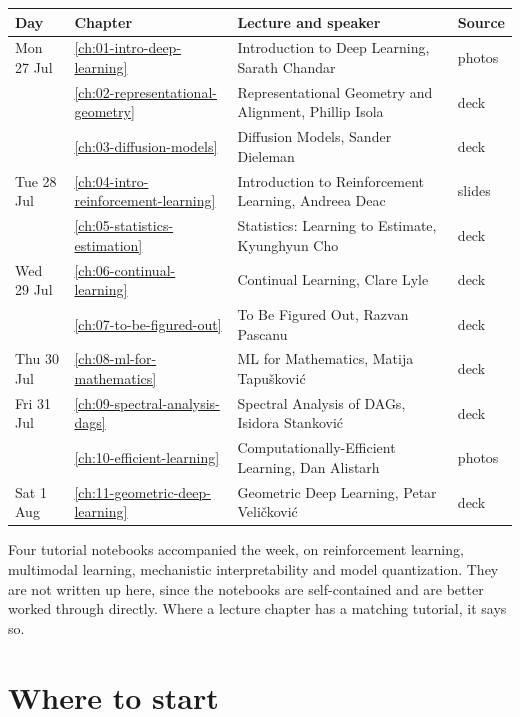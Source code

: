 \begin{center}
\small
\begin{tabularx}{\textwidth}{@{}l l X l@{}}
\toprule
\textbf{Day} & \textbf{Chapter} & \textbf{Lecture and speaker} & \textbf{Source} \\
\midrule
Mon 27 Jul & \ref{ch:01-intro-deep-learning} & Introduction to Deep Learning, Sarath Chandar
  & photos \\
           & \ref{ch:02-representational-geometry} & Representational Geometry and Alignment,
  Phillip Isola & deck \\
           & \ref{ch:03-diffusion-models} & Diffusion Models, Sander Dieleman & deck \\
Tue 28 Jul & \ref{ch:04-intro-reinforcement-learning} & Introduction to Reinforcement Learning,
  Andreea Deac & slides \\
           & \ref{ch:05-statistics-estimation} & Statistics: Learning to Estimate,
  Kyunghyun Cho & deck \\
Wed 29 Jul & \ref{ch:06-continual-learning} & Continual Learning, Clare Lyle & deck \\
           & \ref{ch:07-to-be-figured-out} & To Be Figured Out, Razvan Pascanu & deck \\
Thu 30 Jul & \ref{ch:08-ml-for-mathematics} & ML for Mathematics, Matija Tapu\v{s}kovi\'{c}
  & deck \\
Fri 31 Jul & \ref{ch:09-spectral-analysis-dags} & Spectral Analysis of DAGs,
  Isidora Stankovi\'{c} & deck \\
           & \ref{ch:10-efficient-learning} & Computationally-Efficient Learning, Dan Alistarh
  & photos \\
Sat 1 Aug  & \ref{ch:11-geometric-deep-learning} & Geometric Deep Learning,
  Petar Veli\v{c}kovi\'{c} & deck \\
\bottomrule
\end{tabularx}
\end{center}

\noindent Four tutorial notebooks accompanied the week, on reinforcement learning, multimodal
learning, mechanistic interpretability and model quantization. They are not written up here,
since the notebooks are self-contained and are better worked through directly. Where a lecture
chapter has a matching tutorial, it says so.

\section*{Where to start}

